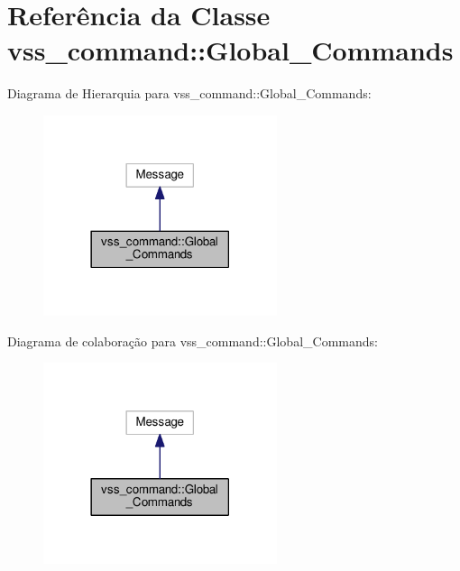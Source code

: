 \hypertarget{classvss__command_1_1Global__Commands}{}\section{Referência da Classe vss\+\_\+command\+:\+:Global\+\_\+\+Commands}
\label{classvss__command_1_1Global__Commands}


Diagrama de Hierarquia para vss\+\_\+command\+:\+:Global\+\_\+\+Commands\+:\nopagebreak
\begin{figure}[H]
\begin{center}
\leavevmode
\includegraphics[width=194pt]{classvss__command_1_1Global__Commands__inherit__graph}
\end{center}
\end{figure}


Diagrama de colaboração para vss\+\_\+command\+:\+:Global\+\_\+\+Commands\+:\nopagebreak
\begin{figure}[H]
\begin{center}
\leavevmode
\includegraphics[width=194pt]{classvss__command_1_1Global__Commands__coll__graph}
\end{center}
\end{figure}
